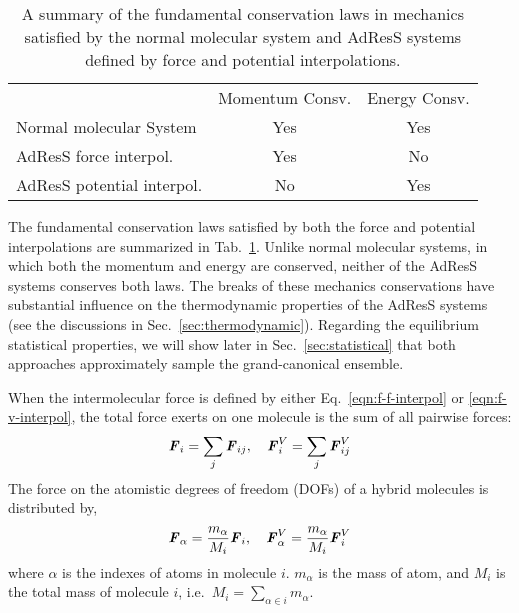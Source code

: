 \documentclass[epjST]{svjour}
\newcommand{\vect}[1]{\textbf{\textit{#1}}}
\newcommand{\moleidxone}[0]{i}
\newcommand{\moleidxtwo}[0]{j}
\newcommand{\atomidxone}[0]{\alpha}
\begin{document}
\begin{table}
  \centering
  \caption{A summary of the fundamental conservation laws in mechanics 
    satisfied by the normal molecular system and AdResS systems defined by force and potential interpolations.}
  \label{tab:conv-laws}
  \begin{tabular*}{0.8\textwidth}{@{\extracolsep{\fill}}lcc}\hline\hline
    &         Momentum Consv.     &       Energy Consv. \\
    Normal molecular System     &       {Yes}        &       {Yes}\\      
    AdResS force interpol.   &       {Yes}        &       {No}\\      
    AdResS potential interpol.  &     {No}  &       {Yes}\\\hline\hline
  \end{tabular*}
\end{table}
The fundamental conservation laws satisfied by both the force and potential interpolations
are summarized in Tab.~\ref{tab:conv-laws}. Unlike normal molecular systems, in which both
the momentum and energy are conserved, neither of the AdResS systems conserves
both laws. The breaks of these mechanics conservations have substantial influence on the thermodynamic
properties of the AdResS systems (see the discussions in Sec.~\ref{sec:thermodynamic}).
Regarding the equilibrium statistical properties, we will show later in Sec.~\ref{sec:statistical}
that both approaches approximately sample the grand-canonical ensemble.

When the intermolecular force is defined by either
Eq.~\eqref{eqn:f-f-interpol} or \eqref{eqn:f-v-interpol}, the total
force exerts on one molecule is the sum of all pairwise forces:
\begin{align}
  \vect F_\moleidxone = \sum_\moleidxtwo \vect F_{\moleidxone\moleidxtwo}, \quad \vect F^V_\moleidxone = \sum_\moleidxtwo \vect F^V_{\moleidxone\moleidxtwo}
\end{align}
The force on the atomistic degrees of freedom (DOFs) of a hybrid molecules is distributed 
by, 
\begin{align}
  \vect F_\atomidxone = \frac{m_\atomidxone}{M_\moleidxone}\vect F_\moleidxone, \quad   \vect F^V_\atomidxone = \frac{m_\atomidxone}{M_\moleidxone}\vect F^V_\moleidxone 
\end{align}
where  $\atomidxone$ is the indexes of atoms in molecule $\moleidxone$.
$m_\atomidxone$ is the mass of atom, and $M_\moleidxone$ is the total mass of molecule $\moleidxone$, i.e.~$M_\moleidxone = \sum_{\atomidxone\in\moleidxone}m_\atomidxone$.
\end{document}
